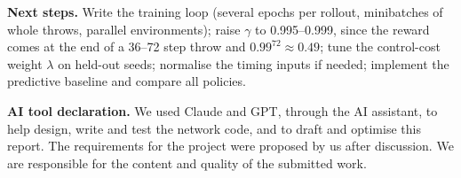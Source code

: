 \documentclass[10pt,a4paper]{article}
\begin{document}
\textbf{Next steps.} Write the training loop (several epochs per rollout, minibatches of whole throws,
parallel environments); raise $\gamma$ to 0.995--0.999, since the reward comes at the end of a 36--72
step throw and $0.99^{72} \approx 0.49$; tune the control-cost weight $\lambda$ on held-out seeds;
normalise the timing inputs if needed; implement the predictive baseline and compare all policies.

\textbf{AI tool declaration.} We used Claude and GPT, through the AI assistant, to help design, write
and test the network code, and to draft and optimise this report. The requirements for the project
were proposed by us after discussion. We are responsible for the content and quality of the
submitted work.
\end{document}
